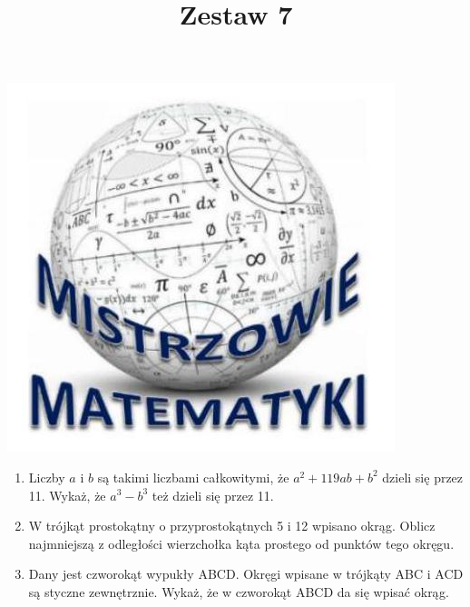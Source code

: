 \documentclass[10pt]{article}
\title{Zestaw 7 }
\author{}
\date{}
\begin{document}
\maketitle
\begin{center}
\includegraphics[max width=\textwidth]{2024_11_21_668feedb2d15504b5d1ag-1}
\end{center}

\begin{enumerate}
  \item Liczby \(a\) i \(b\) są takimi liczbami całkowitymi, że \(a^{2}+119 a b+b^{2}\) dzieli się przez 11. Wykaż, że \(a^{3}-b^{3}\) też dzieli się przez 11.
  \item W trójkąt prostokątny o przyprostokątnych 5 i 12 wpisano okrąg. Oblicz najmniejszą z odległości wierzchołka kąta prostego od punktów tego okręgu.
  \item Dany jest czworokąt wypukły ABCD. Okręgi wpisane w trójkąty ABC i ACD są styczne zewnętrznie. Wykaż, że w czworokąt ABCD da się wpisać okrąg.
\end{enumerate}
\end{document}
